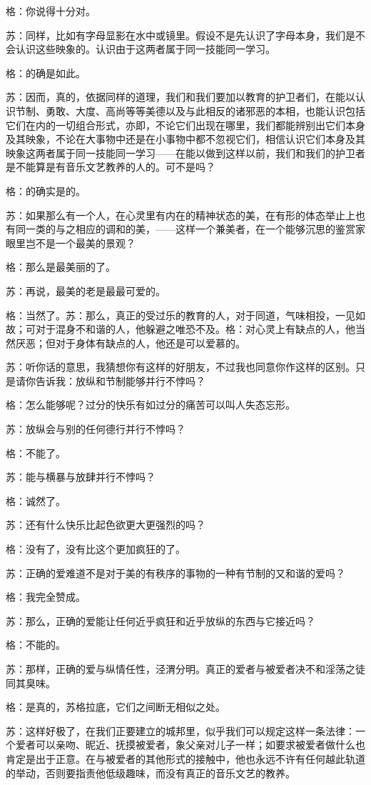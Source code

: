 \documentclass[11pt,oneside]{book}
\begin{document}
\begin{common-format}
格：你说得十分对。

苏：同样，比如有字母显影在水中或镜里。假设不是先认识了字母本身，我们是不会认识这些映象的。认识由于这两者属于同一技能同一学习。

格：的确是如此。

苏：因而，真的，依据同样的道理，我们和我们要加以教育的护卫者们，在能以认识节制、勇敢、大度、高尚等等美德以及与此相反的诸邪恶的本相，也能认识包括它们在内的一切组合形式，亦即，不论它们出现在哪里，我们都能辨别出它们本身及其映象，不论在大事物中还是在小事物中都不忽视它们，相信认识它们本身及其映象这两者属于同一技能同一学习——在能以做到这样以前，我们和我们的护卫者是不能算是有音乐文艺教养的人的。可不是吗？

格：的确实是的。

苏：如果那么有一个人，在心灵里有内在的精神状态的美，在有形的体态举止上也有同一类的与之相应的调和的美，——这样一个兼美者，在一个能够沉思的鉴赏家眼里岂不是一个最美的景观？

格：那么是最美丽的了。

苏：再说，最美的老是最最可爱的。

格：当然了。苏：那么，真正的受过乐的教育的人，对于同道，气味相投，一见如故；可对于混身不和谐的人，他躲避之唯恐不及。格：对心灵上有缺点的人，他当然厌恶；但对于身体有缺点的人，他还是可以爱慕的。

苏：听你话的意思，我猜想你有这样的好朋友，不过我也同意你作这样的区别。只是请你告诉我：放纵和节制能够并行不悖吗？

格：怎么能够呢？过分的快乐有如过分的痛苦可以叫人失态忘形。

苏：放纵会与别的任何德行并行不悖吗？

格：不能了。

苏：能与横暴与放肆并行不悖吗？

格：诚然了。

苏：还有什么快乐比起色欲更大更强烈的吗？

格：没有了，没有比这个更加疯狂的了。

苏：正确的爱难道不是对于美的有秩序的事物的一种有节制的又和谐的爱吗？

格：我完全赞成。

苏：那么，正确的爱能让任何近乎疯狂和近乎放纵的东西与它接近吗？

格：不能的。

苏：那样，正确的爱与纵情任性，泾渭分明。真正的爱者与被爱者决不和淫荡之徒同其臭味。

格：是真的，苏格拉底，它们之间断无相似之处。

苏：这样好极了，在我们正要建立的城邦里，似乎我们可以规定这样一条法律：一个爱者可以亲吻、昵近、抚摸被爱者，象父亲对儿子一样；如要求被爱者做什么也肯定是出于正意。在与被爱者的其他形式的接触中，他也永远不许有任何越此轨道的举动，否则要指责他低级趣味，而没有真正的音乐文艺的教养。


\end{common-format}
\end{document}
